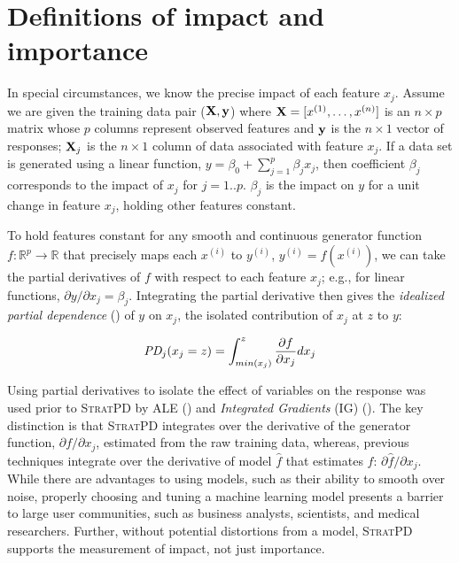 \documentclass[11pt]{article}
\newcommand{\cut}[1]{}
\newcommand{\spd}{\fontfamily{cmr}\textsc{\small StratPD}}
\renewcommand{\xi}{x^{(i)}}
\begin{document}
\section{Definitions of impact and importance}\label{sec:def}

\cut{Practitioners loosely define feature importance as feature predictiveness, which presupposes a fitted predictive model, probably because importances are so often used for feature selection during model development.  Research  focuses on more accurately identifying the impact of features upon model predictions.  But, relying on a fitted model makes it difficult to tease apart the true feature importance from the ability of the model to exploit that feature for prediction purposes. Rather than measuring feature impact on {\em model predictions}, we propose avoiding the model completely to define feature importance as the average impact of a feature on the {\em data set response values}.}

In special circumstances, we know the precise impact of each feature $x_j$. Assume we are given the training data pair ($\bf X, y$) where ${\bf X} = [x^{(1)}, \ldots, x^{(n)}]$ is an $n \times p$ matrix whose $p$ columns represent observed features and ${\bf y}$ is the $n \times 1$ vector of responses; ${\bf X}_j$ is the $n \times 1$ column of data associated with feature $x_j$.  If a data set is generated using a linear function, $y = \beta_0 + \sum_{j=1}^p \beta_j x_j$, then coefficient $\beta_j$ corresponds  to the impact of $x_j$ for $j=1..p$.  $\beta_j$ is the impact on $y$ for a unit change in feature $x_j$, holding other features constant.

To hold features constant for any smooth and continuous generator function $f:\mathbb{R}^{p} \rightarrow \mathbb{R}$ that precisely maps each $\xi$ to $y^{(i)}$, ${y^{(i)}} = f(\xi)$, we can take the partial derivatives of $f$ with respect to each feature $x_j$; e.g., for linear functions, ${\partial y}/{\partial x_j}=\beta_j$. Integrating the partial derivative then gives the {\em idealized partial dependence} (\citealt{stratpd}) of $y$ on $x_j$, the isolated contribution of $x_j$ at $z$ to $y$:

\begin{equation}\label{eq:pd}
\text{\it PD}_j(x_j = z) = \int_{min(x_j)}^z \frac{\partial f}{\partial x_j} dx_j
\end{equation}

Using partial derivatives to isolate the effect of variables on the response was used prior to \spd{} by ALE (\citealt{ALE}) and {\em Integrated Gradients} (IG) (\citealt{intgrad}). The key distinction is that  \spd{} integrates over the derivative of the generator function, ${\partial f}/{\partial x_j}$, estimated from the raw training data, whereas, previous techniques integrate over the derivative of model $\hat{f}$ that estimates $f$: ${\partial \hat{f}}/{\partial x_j}$. While there are advantages to using models, such as their ability to smooth over noise, properly choosing and tuning a machine learning model presents a barrier to large user communities, such as business analysts, scientists, and medical researchers. Further, without potential distortions from a model, \spd{} supports the measurement of impact, not just importance.
\end{document}
